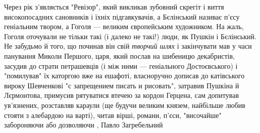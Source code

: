 Через рік з'являється "Ревізор", який викликав зубовний скрегіт і виття
високопосадних сановників і їхніх підгавкувачів, а Бєлінський називає п'єсу
геніальним твором, а Гоголя — великим європейським художником.  На жаль, Гоголя
оточували не тільки такі (і далеко не такі!) люди, як Пушкін і Бєлінський. Не
забудьмо й того, що починав він свій \emph{творчий шлях} і закінчувати мав у часи
панування Миколи Першого, царя, який послав на шибеницю декабристів, засудив до
страти петрашевців (і між ними — геніального Достоєвського) і "помилував" їх
каторгою вже на ешафоті, власноручно дописав до катівського вироку Шевченкові
"с запрещением писать и рисовать", затравив Пушкіна й Лєрмонтова, примусив
рятуватися втечею за кордон Герцена, сам допитував ув'язнених, розставляв
караули (ще будучи великим князем, найбільше любив стояти з алебардою на
варті), читав вірші, романи, п'єси, "височайше" забороняючи або дозволяючи
, Павло Загребельний
